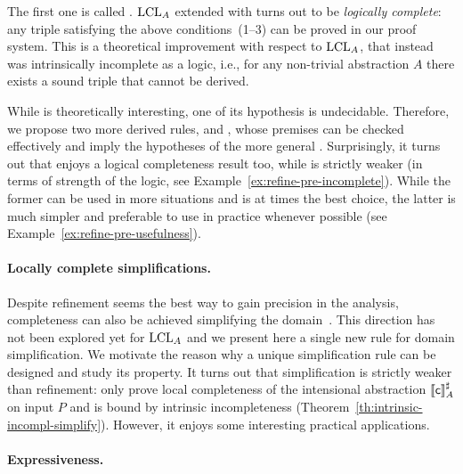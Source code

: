 The first one is called . $\text{LCL}_A$ extended with  turns out to be \emph{logically complete}: any triple satisfying the above conditions~(1--3) can be proved in our proof system. This is a theoretical improvement with respect to $\text{LCL}_A$, that instead was intrinsically incomplete as a logic, i.e., for any non-trivial abstraction $A$ there exists a sound triple that cannot be derived.

While  is theoretically interesting, one of its hypothesis is undecidable. Therefore, we propose two more derived rules,  and , whose premises can be checked effectively and imply the hypotheses of the more general . Surprisingly, it turns out that  enjoys a logical completeness result too, while  is strictly weaker (in terms of strength of the logic, see Example~\ref{ex:refine-pre-incomplete}). While the former can be used in more situations and is at times the best choice, the latter is much simpler and preferable to use in practice whenever possible (see Example~\ref{ex:refine-pre-usefulness}).

\paragraph{Locally complete simplifications.}
Despite refinement seems the best way to gain precision in the analysis, completeness can also be achieved simplifying the domain~\cite{GRS00}. 
This direction has not been explored yet for $\text{LCL}_A$ and we present here a single new rule  for domain simplification. We motivate the reason why a unique simplification rule can be designed and study its property. It turns out that simplification is strictly weaker than refinement:  only prove local completeness of the intensional abstraction $\llbracket\mathsf{c}\rrbracket^{\sharp}_{A}$ on input $P$ and is bound by intrinsic incompleteness (Theorem~\ref{th:intrinsic-incompl-simplify}). However, it enjoys some interesting practical applications.

\paragraph{Expressiveness.}

